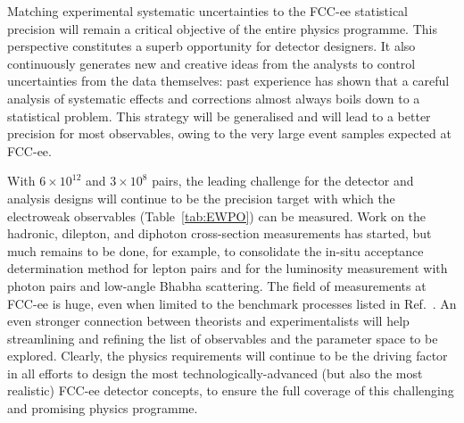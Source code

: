 Matching experimental systematic uncertainties to the FCC-ee statistical precision 
will remain a critical objective of the entire physics programme. 
This perspective constitutes a superb opportunity for detector designers. 
It also continuously generates new and creative ideas from the analysts to control uncertainties from the data themselves: 
past experience has shown that a careful analysis of systematic effects and corrections almost always
boils down to a statistical problem. 
This strategy will be generalised and will lead to a better precision for most observables, 
owing to the very large event samples expected at FCC-ee.   

With $6 \times 10^{12}$ \PZ and $3 \times 10^8$ \PW pairs, 
the leading challenge for the detector and analysis designs will continue to be the precision 
target with which the electroweak observables (Table~\ref{tab:EWPO}) can be measured.
%
Work on the hadronic, dilepton, and diphoton cross-section measurements has started, 
but much remains to be done, 
for example, to consolidate the in-situ acceptance determination method for lepton pairs 
and for the luminosity measurement with photon pairs and low-angle Bhabha scattering. 
The field of measurements at FCC-ee is huge, even when limited to the benchmark processes listed in
Ref.~\cite{SnowmassBenchmarkProcesses}. 
An even stronger connection between theorists and experimentalists will help streamlining and refining 
the list of observables and the parameter space to be explored. 
Clearly, the physics requirements will continue to be the driving factor in all efforts to design 
the most technologically-advanced (but also the most realistic) FCC-ee detector concepts, 
to ensure the full coverage of this challenging and promising physics programme.
